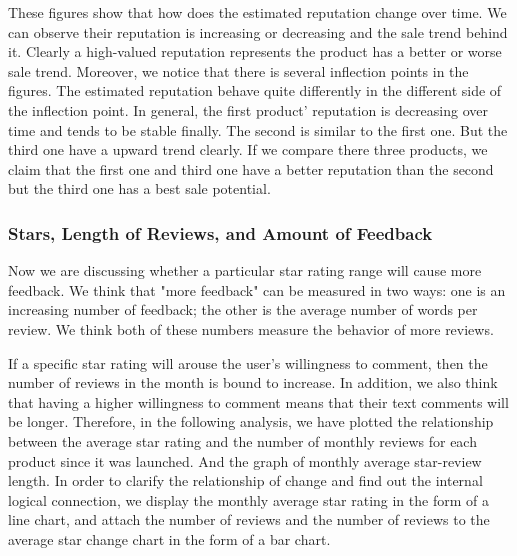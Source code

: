 \documentclass{mcmthesis}
\begin{document}
These figures show that how does the estimated reputation change over time. We can observe their reputation is increasing or decreasing and the sale trend behind it. Clearly a high-valued reputation represents the product has a better or worse sale trend. Moreover, we notice that there is several inflection points in the figures. The estimated reputation behave quite differently in the different side of the inflection point. In general, the first product' reputation is decreasing over time and tends to be stable finally. The second is similar to the first one. But the third one have a upward trend clearly. If we compare there three products, we claim that the first one and third one have a better reputation than the second but the third one has a best sale potential.

\subsubsection{Stars, Length of Reviews, and Amount of Feedback} 
Now we are discussing whether a particular star rating range will cause more feedback. We think that "more feedback" can be measured in two ways: one is an increasing number of feedback; the other is the average number of words per review. We think both of these numbers measure the behavior of more reviews.

If a specific star rating will arouse the user's willingness to comment, then the number of reviews in the month is bound to increase. In addition, we also think that having a higher willingness to comment means that their text comments will be longer.
Therefore, in the following analysis, we have plotted the relationship between the average star rating and the number of monthly reviews for each product since it was launched. And the graph of monthly average star-review length. In order to clarify the relationship of change and find out the internal logical connection, we display the monthly average star rating in the form of a line chart, and attach the number of reviews and the number of reviews to the average star change chart in the form of a bar chart.
\end{document}
